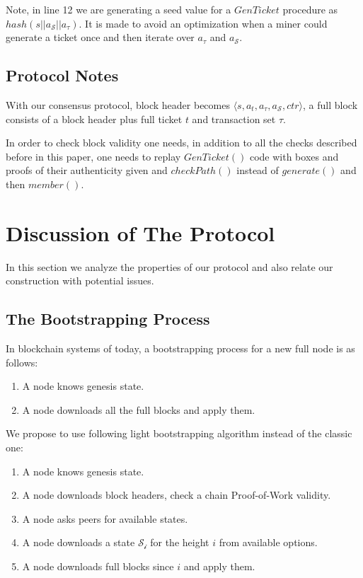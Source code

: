 \documentclass[conference,compsoc]{IEEEtran}
\begin{document}
Note, in line 12 we are generating a seed value for a \(GenTicket\) procedure as $hash(s || a_\mathcal{S} || a_\tau)$. It is made to avoid an optimization when a miner could generate a ticket once and then iterate over $a_\tau$ and $a_\mathcal{S}$. 


\subsection{Protocol Notes}

With our consensus protocol, block header becomes $\langle s, a_t, a_\tau, a_\mathcal{S}, ctr \rangle$, a full block consists of a block header plus full ticket $t$ and transaction set $\tau$.

In order to check block validity one needs, in addition to all the checks described before in this paper, one needs to replay $GenTicket()$ code with boxes and proofs of their authenticity given and $checkPath()$ instead of $generate()$ and then $member()$.


\section{Discussion of The Protocol}
\label{discussion}

In this section we analyze the properties of our protocol and also relate our construction with potential issues.

\subsection{The Bootstrapping Process}

In blockchain systems of today, a bootstrapping process for a new full node is as follows:

\begin{enumerate}
\item A node knows genesis state.
\item A node downloads all the full blocks and apply them. 
\end{enumerate}


We propose to use following light bootstrapping algorithm instead of the classic one:

\begin{enumerate}
\item A node knows genesis state.
\item A node downloads block headers, check a chain Proof-of-Work validity. 
\item A node asks peers for available states. 
\item A node downloads a state $\mathcal{S_i}$ for the height $i$ from available options.
\item A node downloads full blocks since $i$ and apply them. 
\end{enumerate}
\end{document}
